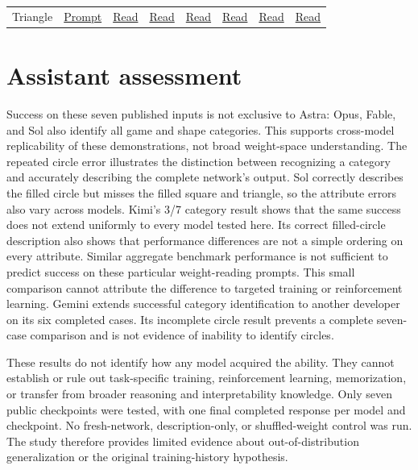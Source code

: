 \documentclass[11pt]{article}
\begin{document}
\begin{longtable}{llllllll}
Triangle & \href{https://github.com/yikerman/llm-rw-weight-extended-test/blob/master/results/experiment-2-triangle/prompt.txt}{Prompt} & \href{https://github.com/yikerman/llm-rw-weight-extended-test/blob/master/results/experiment-2-triangle/gpt-6-astra-transcript.md}{Read} & \href{https://github.com/yikerman/llm-rw-weight-extended-test/blob/master/results/experiment-2-triangle/gpt-6.1-sol-transcript.md}{Read} & \href{https://github.com/yikerman/llm-rw-weight-extended-test/blob/master/results/experiment-2-triangle/claude-opus-5-5-transcript.md}{Read} & \href{https://github.com/yikerman/llm-rw-weight-extended-test/blob/master/results/experiment-2-triangle/claude-fable-5-1-transcript.md}{Read} & \href{https://github.com/yikerman/llm-rw-weight-extended-test/blob/master/results/experiment-2-triangle/kimi-k3.1-pro-transcript.md}{Read} & \href{https://github.com/yikerman/llm-rw-weight-extended-test/blob/master/results/experiment-2-triangle/gemini-4-argon-transcript.md}{Read}\\
\end{longtable}\endgroup


\section*{Assistant assessment}
Success on these seven published inputs is not exclusive to Astra: Opus,
Fable, and Sol also identify all game and shape categories. This supports cross-model
replicability of these demonstrations, not broad weight-space understanding.
The repeated circle error illustrates the distinction between recognizing a
category and accurately describing the complete network's output. Sol correctly
describes the filled circle but misses the filled square and triangle, so the
attribute errors also vary across models.
Kimi's 3/7 category result shows that the same success does not extend uniformly
to every model tested here. Its correct filled-circle description also shows
that performance differences are not a simple ordering on every attribute.
Similar aggregate benchmark performance is not sufficient to predict success
on these particular weight-reading prompts. This small comparison cannot
attribute the difference to targeted training or reinforcement learning.
Gemini extends successful category identification to another developer on its
six completed cases. Its incomplete circle result prevents a complete seven-case
comparison and is not evidence of inability to identify circles.

These results do not identify how any model acquired the ability. They cannot
establish or rule out task-specific training, reinforcement learning,
memorization, or transfer from broader reasoning and interpretability knowledge.
Only seven public checkpoints were tested, with one final completed response
per model and checkpoint. No fresh-network, description-only, or shuffled-weight
control was run. The study therefore provides limited evidence about
out-of-distribution generalization or the original training-history hypothesis.
\end{document}
